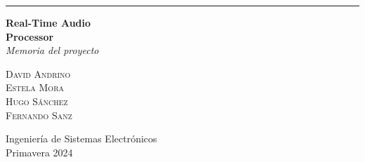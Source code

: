 
\begin{titlepage}
    \raggedleft
    \rule{1pt}{\textheight}
    \hspace{0.05\textwidth}
    \parbox[b]{0.9\textwidth}{
            {\Huge\bfseries Real-Time Audio \\[5px] Processor}\\[\baselineskip] %
            {\Large\textit{Memoria del proyecto}}\\[7\baselineskip] %
        \vspace{0.45\textheight}
        
        {\Large\textsc{David Andrino}}\\[0.5\baselineskip]
        {\Large\textsc{Estela Mora}}\\[0.5\baselineskip]
        {\Large\textsc{Hugo Sánchez}}\\[0.5\baselineskip]
        {\Large\textsc{Fernando Sanz}}\\
        \vspace{0.05\textheight}
        
        {\noindent\large Ingeniería de Sistemas Electrónicos}\\
        {\noindent\large Primavera 2024}\\
    }

\end{titlepage}